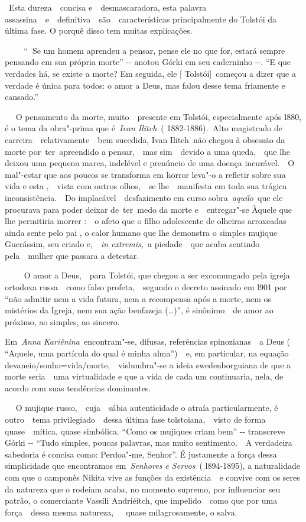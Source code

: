 ~Esta dureza~~concisa e~~desmascaradora, esta palavra
assassina~~e~~definitiva~~são~~características principalmente do Tolstói
da última fase. O porquê disso tem muitas explicações.~

\textbf{~~~~}``\textbf{~}Se um homem aprendeu a pensar, pense ele no que
for, estará sempre pensando em sua própria morte'' -\/- anotou Górki em
seu caderninho -\/-. ``E que verdades há, se existe a morte? Em seguida,
ele {[} Tolstói{]}~começou a dizer que a verdade é única para todos: o
amor a Deus, mas falou desse tema friamente e cansado.''

~~ O pensamento da morte, muito~~presente em Tolstói, especialmente após
l880, é o tema da obra"-prima que é~\emph{Ivan Ilitch}~(
1882-1886)\emph{.~}Alto magistrado de carreira~~relativamente~~bem
sucedida, Ivan Ilitch\emph{~}não chegou à obsessão da morte
por~ter~apreendido a pensar,~~mas sim~~devido a uma queda,~~que lhe
deixou uma pequena marca, indelével e prenúncio de uma doença
incurável.~~O mal"-estar que aos poucos se transforma em horror leva"-o a
refletir sobre sua vida e esta ,~~vista com outros olhos,~~se
lhe~~manifesta em toda sua trágica inconsistência.~~Do
implacável~~desfazimento em curso sobra~\emph{aquilo}~que ele procurava
para poder deixar de~ter~medo da morte e~~entregar"-se Àquele que lhe
permitiria morrer :~~o afeto que o filho adolescente de olheiras
arroxeadas ainda sente pelo pai , o calor humano que lhe demonstra o
simples mujique Guerássim, seu criado e,~~\emph{in extremis,}~a
piedade~~que acaba sentindo pela~~mulher que passara a detestar.

~~~~ O amor a Deus,~~para Tolstói, que chegou a ser excomungado pela
igreja ortodoxa russa~~como falso profeta,~~segundo o decreto assinado
em l901 por ``não admitir nem a vida futura, nem a recompensa após a
morte, nem os mistérios da Igreja, nem sua ação benfazeja (\ldots{})'', é
sinônimo~~de amor ao próximo, ao simples, ao sincero.

Em~\emph{Anna Kariênina~}encontram"-se, difusas, referências
spinozianas~~a Deus ( ``Aquele, uma partícula do qual é minha
alma'')\emph{~}~e, em particular, na equação
devaneio/sonho=vida/morte,~~vislumbra"-se a ideia swedenborguiana de que
a morte seria~~uma virtualidade e que a vida de cada um continuaria,
nela, de acordo com suas tendências dominantes.

~ ~O mujique russo,~~cuja~~sábia autenticidade o atraía particularmente,
é outro~~tema privilegiado~~dessa última fase tolstoiana,~~visto de
forma quase~~mítica, quase simbólica. ``Como os mujiques criam bem''
-\/- transcreve Górki -\/- ``Tudo simples, poucas palavras, mas muito
sentimento.~~A verdadeira sabedoria é concisa como: Perdoa"-me, Senhor''.
É justamente a força dessa simplicidade que encontramos
em~\emph{Senhores e Servos~}( l894-1895), a naturalidade com que o
camponês Nikita vive as funções da existência~~e convive com os seres da
natureza que o rodeiam acaba, no momento supremo, por influenciar seu
patrão, o comerciante Vassíli Andriéitch, que impelido~~como que por uma
força~~dessa mesma natureza,~~~quase milagrosamente, o salva.

